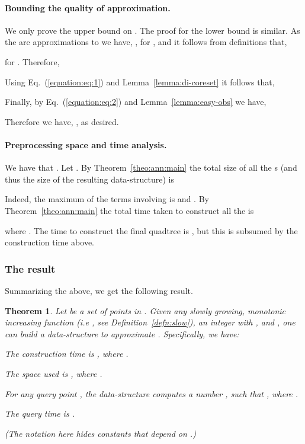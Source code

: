 \documentclass[12pt]{article}
\providecommand{\lemref}[1]{Lemma~\ref{lemma:#1}}
\newtheorem{theorem}{Theorem}[section] \newtheorem{lemma}[theorem]{Lemma}
\theoremstyle{remark}{\theorembodyfont{\rm} \newtheorem{remark}[theorem]{Remark}}
\newcommand{\thmlab}[1]{{\label{theo:#1}}}
\newcommand{\thmref}[1]{Theorem~\ref{theo:#1}}
\newcommand{\Eqref}[1]{Eq.~(\ref{equation:#1})}
\newcommand{\defref}[1]{Definition~\ref{defn:#1}}
\begin{document}
\paragraph{Bounding the quality of approximation.}
We only prove the upper bound on . The proof for the lower
bound is similar.  As the  are 
approximations to  we have,
, for , and it follows from definitions that,

for .  Therefore,

Using \Eqref{eq:1} and \lemref{di-coreset} it follows that,

Finally, by \Eqref{eq:2} and \lemref{easy-obs} we have,

Therefore we have, , as desired.


\paragraph{Preprocessing space and time analysis.}
We have that .  Let
.  By \thmref{ann:main} the total
size of all the s (and thus the size of the resulting
data-structure) is

Indeed, the maximum of the terms involving  is
 and .  By
\thmref{ann:main} the total time taken to construct all the  is

where .  The time to construct
the final quadtree is , but this is subsumed by the
construction time above.


\subsubsection{The result}
Summarizing the above, we get the following result.
\begin{theorem}
    \thmlab{thm:appln:ddm}Let  be a set of  points in .  Given any slowly
    growing, monotonic increasing function 
    (i.e , see \defref{slow}), an integer  with 
    , and ,
    one can build a data-structure to approximate
    . Specifically, we have:
    \begin{compactenum}[\qquad\rm (A)]
        \item The construction time is ,
        where .
        \item The space used is , where .
        \item For any query point , the data-structure
        computes a number , such that , where
        .
        \item The query time is .
    \end{compactenum}
    (The  notation here hides constants that depend on .)
\end{theorem}
\end{document}
